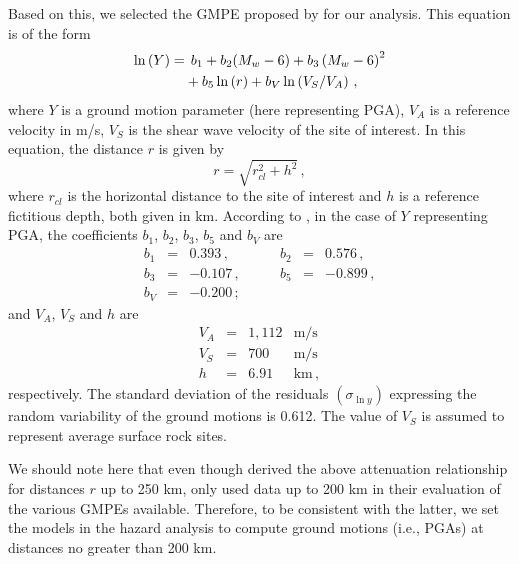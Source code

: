 Based on this, we selected the GMPE proposed by \citet{Kalkan2004} for our analysis. This equation is of the form
% 
\begin{align}
	\ln \left( Y \right) =
		& \hspace{1ex} b_1 + b_2(M_w - 6) + b_3 \left( M_w - 6 \right)^{2} \nonumber \\ 
		& + b_5 \ln \left( r \right) + b_V \ln \left( V_S / V_A \right)
	\, ,
\end{align}
% 
where $Y$ is a ground motion parameter (here representing PGA), $V_A$ is a reference velocity in m/s,  $V_S$ is the shear wave velocity of the site of interest. In this equation, the distance $r$ is given by
% 
\begin{equation}
	r= \sqrt{ r^2_{\mathit{cl}} + h^2 }
	\, ,
\end{equation}
% 
where $r_{\mathit{cl}}$ is the horizontal distance to the site of interest and $h$ is a reference fictitious depth, both given in km. According to \citet{Kalkan2004}, in the case of $Y$ representing PGA, the coefficients $b_1$, $b_2$, $b_3$, $b_5$ and $b_V$ are
% 
\begin{equation}
\begin{array}{lcrlcr} 
	b_1 &=&  0.393   \,,&\hspace{2em}   b_2 &=& 0.576\,,   \\
	b_3 &=& -0.107   \,,&\hspace{2em}   b_5 &=& -0.899\,,  \\
	b_V &=& -0.200   \,; 
	\nonumber
\end{array}
\end{equation}
% 
and $V_A$, $V_S$ and $h$ are
% 
\begin{equation}
\begin{array}{lcrl} 
	V_A &=& 1,112 & \mathrm{m/s}	\\
	V_S &=&   700 & \mathrm{m/s}	\\
	h   &=&  6.91 & \mathrm{km}\,,
	\nonumber
\end{array}
\end{equation}
% 
respectively. The standard deviation of the residuals $(\sigma_{\ln y})$ expressing the random variability of the ground motions is 0.612. The value of $V_S$ is assumed to represent average surface rock sites.

We should note here that even though \citet{Kalkan2004} derived the above attenuation relationship for distances $r$ up to 250 km, \citet{Zafarani2014} only used data up to 200 km in their evaluation of the various GMPEs available. Therefore, to be consistent with the latter, we set the models in the hazard analysis to compute ground motions (i.e., PGAs) at distances no greater than 200 km.

